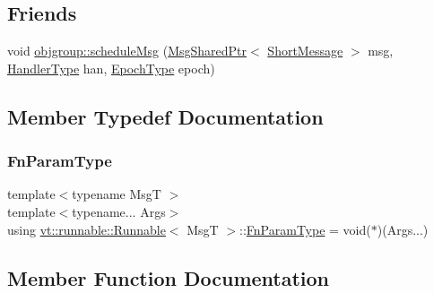 \subsection*{Friends}
\begin{DoxyCompactItemize}
\item 
void \hyperlink{structvt_1_1runnable_1_1_runnable_abbe5d6061278e82454f36a2c0535d066}{objgroup\+::schedule\+Msg} (\hyperlink{namespacevt_ab2b3d506ec8e8d1540aede826d84a239}{Msg\+Shared\+Ptr}$<$ \hyperlink{namespacevt_a1125ac1da6c0bbf141e0ea0739d7602d}{Short\+Message} $>$ msg, \hyperlink{namespacevt_af64846b57dfcaf104da3ef6967917573}{Handler\+Type} han, \hyperlink{namespacevt_a985a5adf291c34a3ca263b3378388236}{Epoch\+Type} epoch)
\end{DoxyCompactItemize}


\subsection{Member Typedef Documentation}
\mbox{\label{structvt_1_1runnable_1_1_runnable_aaad8725f31ab762ded7babaaf83574a3}} 
\subsubsection{\texorpdfstring{Fn\+Param\+Type}{FnParamType}}
{\footnotesize\ttfamily template$<$typename MsgT $>$ \\
template$<$typename... Args$>$ \\
using \hyperlink{structvt_1_1runnable_1_1_runnable}{vt\+::runnable\+::\+Runnable}$<$ MsgT $>$\+::\hyperlink{structvt_1_1runnable_1_1_runnable_aaad8725f31ab762ded7babaaf83574a3}{Fn\+Param\+Type} =  void($\ast$)(Args...)}



\subsection{Member Function Documentation}
\mbox{\label{structvt_1_1runnable_1_1_runnable_a8d99f9d7b1b29545b1595f40a1bd2845}} 
